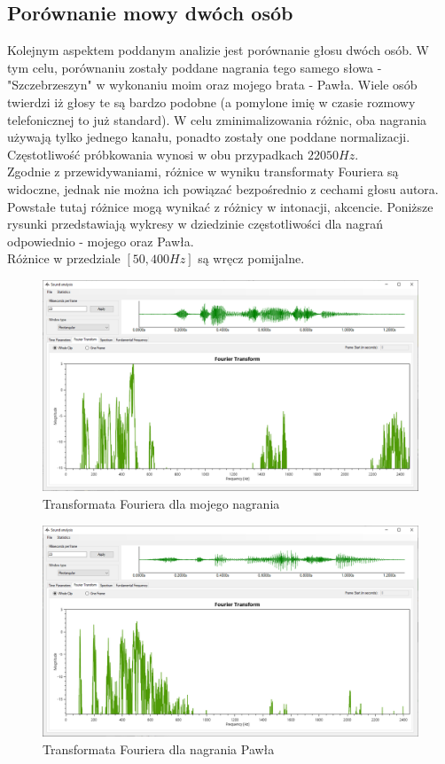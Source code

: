 \documentclass[a4paper]{article}
\begin{document}
\subsection{Porównanie mowy dwóch osób}
Kolejnym aspektem poddanym analizie jest porównanie głosu dwóch osób. W tym celu, porównaniu zostały poddane nagrania tego samego słowa - "Szczebrzeszyn" w wykonaniu moim oraz mojego brata - Pawła. Wiele osób twierdzi iż głosy te są bardzo podobne (a pomylone imię w czasie rozmowy telefonicznej to już standard). W celu zminimalizowania różnic, oba nagrania używają tylko jednego kanału, ponadto zostały one poddane normalizacji. Częstotliwość próbkowania wynosi w obu przypadkach $22050 Hz$.\\
Zgodnie z przewidywaniami, różnice w wyniku transformaty Fouriera są widoczne, jednak nie można ich powiązać bezpośrednio z cechami głosu autora. Powstałe tutaj różnice mogą wynikać z różnicy w intonacji, akcencie. Poniższe rysunki przedstawiają wykresy w dziedzinie częstotliwości dla nagrań odpowiednio - mojego oraz Pawła.\\
Różnice w przedziale $[50, 400 Hz]$ są wręcz pomijalne.
\begin{figure}[H]
  \centering
  \includegraphics[width=0.86\linewidth]{images/10fourierMy.png}
  \caption{Transformata Fouriera dla mojego nagrania}
\end{figure}
\begin{figure}[H]
  \centering
  \includegraphics[width=0.86\linewidth]{images/11fourierBro.png}
  \caption{Transformata Fouriera dla nagrania Pawła}
\end{figure}
\end{document}

